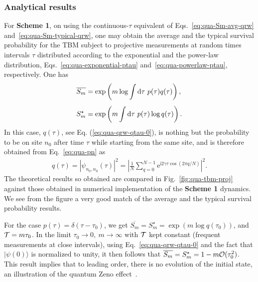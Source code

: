 \documentclass[12pt]{iopart}
\def\ra{\rangle}
\newcommand{\ee}{\mathrm{e}}
\newcommand{\ii}{\mathrm{i}}
\begin{document}
\subsubsection{Analytical results}
\label{sec:TBM2b}

For {\bf Scheme 1}, on using the continuous-$\tau$ equivalent of Eqs.~\eqref{eq:qua-Sm-avg-qrw}
and~\eqref{eq:qua-Sm-typical-qrw}, one may obtain 
the average and the typical survival probability for the TBM subject to
projective measurements at random times intervals $\tau$ distributed
according to the exponential and the power-law
distribution, Eqs.~\eqref{eq:qua-exponential-ptau}
and~\eqref{eq:qua-powerlaw-ptau}, respectively. 
One has 
\begin{equation}
\begin{aligned}
        &\overline{S_m}=\exp\left(m\log \int {\rm
        d}\tau~p(\tau)q(\tau)\right),  \\[1ex]
        \label{eq:survival-prob-TBM-projected} 
        &S_m^\star=\exp\left(m \int {\rm
        d}\tau~p(\tau)\log q(\tau)\right). 
\end{aligned}
\end{equation}
In this case,  $q(\tau)$, see Eq. (\ref{eq:qua-qrw-qtau-0}), is nothing
but the probability to be on site $n_0$ after time $\tau$ while starting
from the same site, and is therefore obtained from Eq.~\eqref{eq:qua-pn} as
\begin{align}
q(\tau)= |\psi_{n_0,n_0}(\tau)|^2= \left|\frac{1}{N}\sum_{q=0}^{N-1} \ee^{\ii 2 \gamma \tau \cos (2\pi q/N)}\right|^2.
        \label{eq:qua-tbm-qtau}
\end{align}
The theoretical results so
obtained are compared in Fig.~\ref{fig:qua-tbm-proj} against those obtained in 
numerical implementation of the {\bf Scheme 1} dynamics. We see from the
figure a very good match of the average and the typical survival
probability results. 

For the case $p(\tau)=\delta(\tau-\tau_0)$, we get
$\overline{S_m}=S_m^\star=\exp\left(m \log q(\tau_0)\right)$, and ${\cal
T}=m\tau_0$. In the
limit $\tau_0 \to 0,~m \to \infty$ with ${\cal T}$ kept constant
(frequent measurements at close intervals), using Eq.~\eqref{eq:qua-qrw-qtau-0} and the fact
that $|\psi(0)\ra$ is normalized to unity, it then follows that
$\overline{S_m}=S_m^\star=1-m{\cal O}(\tau_0^2)$. This result implies that to
leading order, there is no evolution of the initial state, an
illustration of the quantum Zeno effect~\cite{Misra:1977}.
\end{document}
